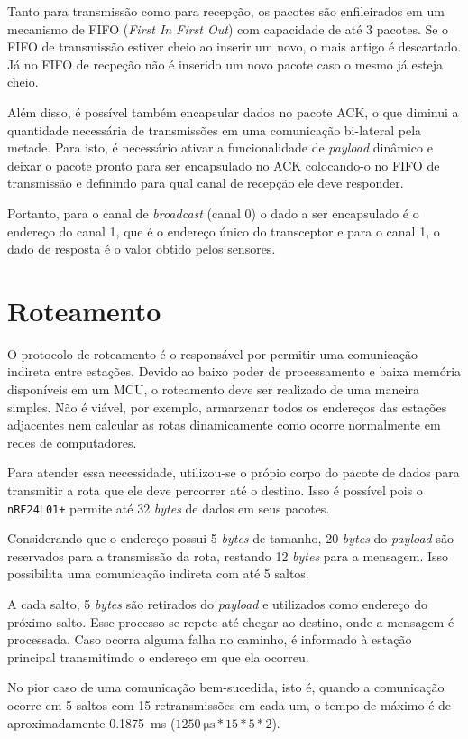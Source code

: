 {Tanto para transmissão como para recepção, os pacotes são enfileirados em um mecanismo de FIFO (\textit{First
In First Out}) com capacidade de até 3 pacotes. Se o FIFO de transmissão estiver cheio ao inserir um novo, o
mais antigo é descartado. Já no FIFO de recpeção não é inserido um novo pacote caso o mesmo já esteja cheio.

Além disso, é possível também encapsular dados no pacote ACK, o que diminui a quantidade necessária de
transmissões em uma comunicação bi-lateral pela metade. Para isto, é necessário ativar a funcionalidade de
\textit{payload} dinâmico e deixar o pacote pronto para ser encapsulado no ACK colocando-o no FIFO de
transmissão e definindo para qual canal de recepção ele deve responder.

Portanto, para o canal de \textit{broadcast} (canal 0) o dado a ser encapsulado é o endereço do canal 1, que é o
endereço único do transceptor e para o canal 1, o dado de resposta é o valor obtido pelos sensores.

\section{Roteamento}
O protocolo de roteamento é o responsável por permitir uma comunicação indireta entre estações. Devido ao
baixo poder de processamento e baixa memória disponíveis em um MCU, o roteamento deve ser realizado de uma
maneira simples. Não é viável, por exemplo, armarzenar todos os endereços das estações adjacentes nem
calcular as rotas dinamicamente como ocorre normalmente em redes de computadores.

Para atender essa necessidade, utilizou-se o própio corpo do pacote de dados para transmitir a rota
que ele deve percorrer até o destino. Isso é possível pois o \texttt{nRF24L01+} permite até 32
\textit{bytes} de dados em seus pacotes.

Considerando que o endereço possui 5 \textit{bytes} de tamanho, 20 \textit{bytes} do \textit{payload} são
reservados para a transmissão da rota, restando 12 \textit{bytes} para a mensagem. Isso possibilita uma
comunicação indireta com até 5 saltos.

A cada salto, 5 \textit{bytes} são retirados do \textit{payload} e utilizados como endereço do próximo salto.
Esse processo se repete até chegar ao destino, onde a mensagem é processada. Caso ocorra alguma falha no
caminho, é informado à estação principal transmitimdo o endereço em que ela ocorreu.

No pior caso de uma comunicação bem-sucedida, isto é, quando a comunicação ocorre em 5 saltos com 15
retransmissões em cada um, o tempo de máximo é de aproximadamente \SI{0.1875}{\milli \second}
($\SI{1250}{\micro \second} * 15 * 5 * 2$).

}
